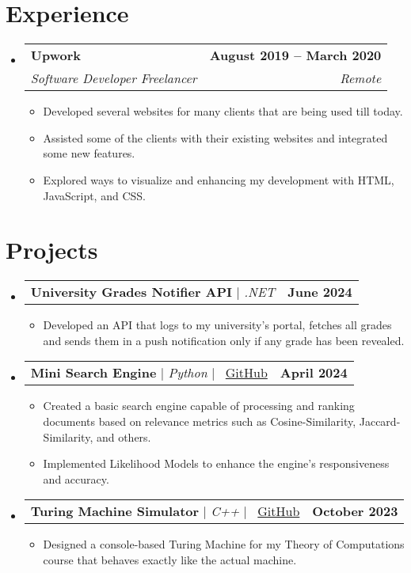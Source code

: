 \documentclass[letterpaper,11pt]{article}
\makeatletter
\newcommand{\resumeItem}[1]{
  \item\small{
    {#1 \vspace{-2pt}}
  }
}
\newcommand{\resumeSubheading}[4]{
  \vspace{-2pt}\item
    \begin{tabular*}{1.0\textwidth}[t]{l@{\extracolsep{\fill}}r}
      \textbf{#1} & \textbf{\small #2} \\
      \textit{\small#3} & \textit{\small #4} \\
    \end{tabular*}\vspace{-7pt}
}
\newcommand{\resumeProjectHeading}[2]{
    \item
    \begin{tabular*}{1.001\textwidth}{l@{\extracolsep{\fill}}r}
      \small#1 & \textbf{\small #2}\\
    \end{tabular*}\vspace{-7pt}
}
\newcommand{\resumeSubHeadingListStart}{\begin{itemize}[leftmargin=0.0in, label={}]}
\newcommand{\resumeSubHeadingListEnd}{\end{itemize}}
\newcommand{\resumeItemListStart}{\begin{itemize}}
\newcommand{\resumeItemListEnd}{\end{itemize}\vspace{-5pt}}
\makeatother
\begin{document}
\section{Experience}
  \resumeSubHeadingListStart

 
    \resumeSubheading
      {Upwork}{August 2019 -- March 2020}
      {Software Developer Freelancer}{Remote}
      \resumeItemListStart
        \resumeItem{Developed several websites for many clients that are being used till today.}
        \resumeItem{Assisted some of the clients with their existing websites and integrated some new features.}
        \resumeItem{Explored ways to visualize and enhancing my development  with HTML, JavaScript, and CSS.}
      \resumeItemListEnd
  
  \resumeSubHeadingListEnd
\vspace{-16pt}
\section{Projects}
    \vspace{-5pt}
    \resumeSubHeadingListStart
      \resumeProjectHeading
          {\textbf{University Grades Notifier API} $|$ \emph{.NET}}{June 2024}
          \resumeItemListStart
            \resumeItem{Developed an API that logs to my university's portal, fetches all grades and sends them in a push notification only if any grade has been revealed.}
          \resumeItemListEnd
          \vspace{-13pt}
     \resumeProjectHeading
{\textbf{Mini Search Engine} $|$ \emph{Python} $|$ \faGithub \ \href{https://github.com/MohamedWElteir/Search-Engine-In-Python}{GitHub}}{April 2024}
\resumeItemListStart
\resumeItem{Created a basic search engine capable of processing and ranking documents based on relevance metrics such as Cosine-Similarity, Jaccard-Similarity, and others.}
\resumeItem{Implemented Likelihood Models to enhance the engine's responsiveness and accuracy.}
\resumeItemListEnd
          \vspace{-13pt}
          \resumeProjectHeading
{\textbf{Turing Machine Simulator} $|$ \emph{C++} $|$ \faGithub \ \href{https://github.com/MohamedWElteir/Turing-Machine-Simulator}{GitHub}}{October 2023}
\resumeItemListStart
\resumeItem{Designed a console-based Turing Machine for my Theory of Computations course that behaves exactly like the actual machine.}
\resumeItemListEnd
    \resumeSubHeadingListEnd
\vspace{-15pt}
\end{document}
